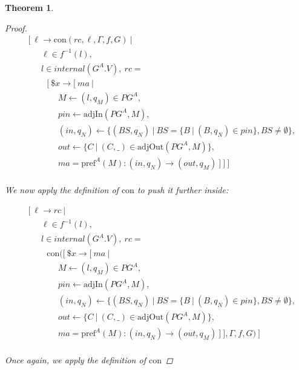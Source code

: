 \documentclass[twocolumn, openany]{sig-alternate-10pt}
\newcommand{\Con}{\mathrm{con}}
\newcommand{\Pref}{\ensuremath{\mathrm{pref}}}
\newtheorem{thm}{Theorem}
\begin{document}
\begin{thm}
\begin{proof}
  \[ \begin{array}{l}
     ~~~~~ [~ \ell \rightarrow \Con(rc, \ell, \Gamma, f, G) ~\vert~ \\
     ~~~~~~~~~~~~ \ell \in f^{-1}(l), \\
     ~~~~~~~~~~~~ l \in internal(G^A.V), ~rc = \\
     ~~~~~~~~~~~~~~~ [~ \$x \rightarrow [~ ma ~\vert~ \\
     ~~~~~~~~~~~~~~~~~~~~~ M \leftarrow (l,q_M) \in PG^A, \\
     ~~~~~~~~~~~~~~~~~~~~~ pin \leftarrow \text{adjIn}(PG^A,M), \\
     ~~~~~~~~~~~~~~~~~~~~~ (in,q_N) \leftarrow \{ (BS,q_N) ~\vert~ BS=\{B ~\vert~ (B,q_N) \in pin \}, BS \neq \emptyset \}, \\
     ~~~~~~~~~~~~~~~~~~~~~ out \leftarrow \{ C ~\vert~ (C,\_) \in \text{adjOut}(PG^A,M) \}, \\
     ~~~~~~~~~~~~~~~~~~~~~ ma = \Pref^A(M) : (in,q_N) \rightarrow (out,q_M) ~] ~] ~] \\
  \end{array} \]%

  \noindent
  We now apply the definition of $\Con$ to push it further inside:

  \[ \begin{array}{l}
     ~~~~~ [~ \ell \rightarrow rc ~\vert~ \\
     ~~~~~~~~~~~~ \ell \in f^{-1}(l), \\
     ~~~~~~~~~~~~ l \in internal(G^A.V), ~rc = \\
     ~~~~~~~~~~~~~~~ \Con([~ \$x \rightarrow [~ ma ~\vert~ \\
     ~~~~~~~~~~~~~~~~~~~~~ M \leftarrow (l,q_M) \in PG^A, \\
     ~~~~~~~~~~~~~~~~~~~~~ pin \leftarrow \text{adjIn}(PG^A,M), \\
     ~~~~~~~~~~~~~~~~~~~~~ (in,q_N) \leftarrow \{ (BS,q_N) ~\vert~ BS=\{B ~\vert~ (B,q_N) \in pin \}, BS \neq \emptyset \}, \\
     ~~~~~~~~~~~~~~~~~~~~~ out \leftarrow \{ C ~\vert~ (C,\_) \in \text{adjOut}(PG^A,M) \}, \\
     ~~~~~~~~~~~~~~~~~~~~~ ma = \Pref^A(M) : (in,q_N) \rightarrow (out,q_M) ~] ~], \Gamma, f, G) ~] \\
  \end{array} \]%

  \noindent
  Once again, we apply the definition of $\Con$


\end{proof}
\end{thm}
\end{document}
